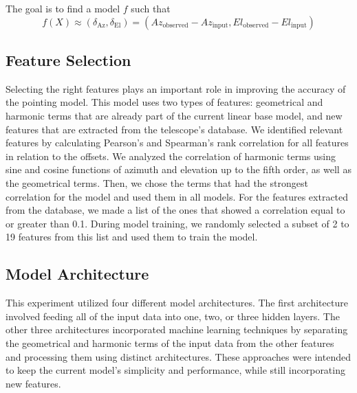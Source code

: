 The goal is to find a model $f$ such that
\begin{equation}
    f(X) \approx (\delta_{\text{Az}}, \delta_{\text{El}}) = (Az_{\text{observed}}-Az_{\text{input}}, El_{\text{observed}}-El_{\text{input}})
\end{equation}


\subsection{Feature Selection}
Selecting the right features plays an important role in improving the accuracy of the pointing model.
This model uses two types of features: geometrical and harmonic terms that are already part of the current linear base model, and new features that are extracted from the telescope's database.
We identified relevant features by calculating Pearson's and Spearman's rank correlation for all features in relation to the offsets.
We analyzed the correlation of harmonic terms using sine and cosine functions of azimuth and elevation up to the fifth order, as well as the geometrical terms.
Then, we chose the terms that had the strongest correlation for the model and used them in all models.
For the features extracted from the database, we made a list of the ones that showed a correlation equal to or greater than 0.1.
During model training, we randomly selected a subset of 2 to 19 features from this list and used them to train the model.

\subsection{Model Architecture}
This experiment utilized four different model architectures.
The first architecture involved feeding all of the input data into one, two, or three hidden layers.
The other three architectures incorporated machine learning techniques by separating the geometrical and harmonic terms of the input data from the other features and processing them using distinct architectures.
These approaches were intended to keep the current model's simplicity and performance, while still incorporating new features.

